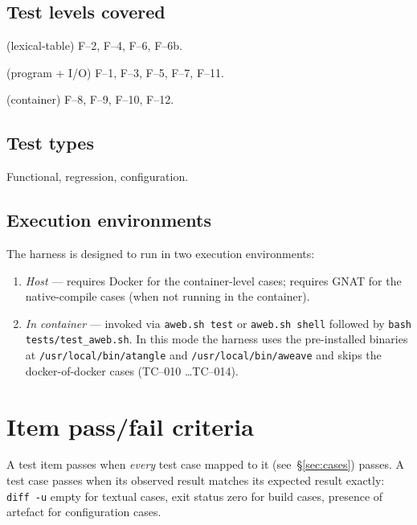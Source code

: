 \documentclass[11pt]{article}
\begin{document}
\subsection{Test levels covered}
\begin{description}[leftmargin=*]
  \item[Unit] (lexical-table) F--2, F--4, F--6, F--6b.
  \item[Integration] (program + I/O) F--1, F--3, F--5, F--7, F--11.
  \item[System] (container) F--8, F--9, F--10, F--12.
\end{description}

\subsection{Test types}
Functional, regression, configuration.

\subsection{Execution environments}
The harness is designed to run in two execution environments:
\begin{enumerate}[leftmargin=*]
  \item \emph{Host} --- requires Docker for the container-level cases;
        requires GNAT for the native-compile cases (when not running in
        the container).
  \item \emph{In container} --- invoked via
        \texttt{aweb.sh test} or \texttt{aweb.sh shell} followed by
        \texttt{bash tests/test\_aweb.sh}.  In this mode the harness
        uses the pre-installed binaries at \texttt{/usr/local/bin/atangle}
        and \texttt{/usr/local/bin/aweave} and skips the docker-of-docker
        cases (TC--010 \dots TC--014).
\end{enumerate}

\section{Item pass/fail criteria}
A test item passes when \emph{every} test case mapped to it (see~\S\ref{sec:cases})
passes.  A test case passes when its observed result matches its
expected result exactly: \texttt{diff~-u} empty for textual cases, exit
status zero for build cases, presence of artefact for configuration
cases.
\end{document}
